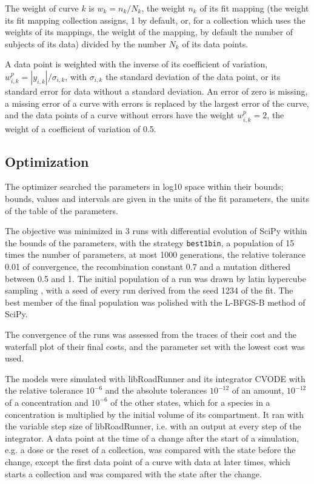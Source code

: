 The weight of curve $k$ is $w_k = n_k / N_k$, the weight $n_k$ of its fit mapping (the weight its fit mapping collection assigns, 1 by default, or, for a collection which uses the weights of its mappings, the weight of the mapping, by default the number of subjects of its data) divided by the number $N_k$ of its data points.

A data point is weighted with the inverse of its coefficient of variation, $w^{p}_{i,k} = |y_{i,k}| / \sigma_{i,k}$, with $\sigma_{i,k}$ the standard deviation of the data point, or its standard error for data without a standard deviation. An error of zero is missing, a missing error of a curve with errors is replaced by the largest error of the curve, and the data points of a curve without errors have the weight $w^{p}_{i,k} = 2$, the weight of a coefficient of variation of 0.5.

\subsection{Optimization}

The optimizer searched the parameters in log10 space within their bounds; bounds, values and intervals are given in the units of the fit parameters, the units of the table of the parameters.

The objective was minimized in 3 runs with differential evolution \cite{Storn1997} of SciPy \cite{Virtanen2020} within the bounds of the parameters, with the strategy \texttt{best1bin}, a population of 15 times the number of parameters, at most 1000 generations, the relative tolerance 0.01 of convergence, the recombination constant 0.7 and a mutation dithered between 0.5 and 1. The initial population of a run was drawn by latin hypercube sampling \cite{McKay1979}, with a seed of every run derived from the seed 1234 of the fit. The best member of the final population was polished with the L-BFGS-B method of SciPy.

The convergence of the runs was assessed from the traces of their cost and the waterfall plot of their final costs, and the parameter set with the lowest cost was used.

The models were simulated with libRoadRunner \cite{Welsh2023} and its integrator CVODE \cite{Hindmarsh2005} with the relative tolerance $10^{-6}$ and the absolute tolerances $10^{-12}$ of an amount, $10^{-12}$ of a concentration and $10^{-6}$ of the other states, which for a species in a concentration is multiplied by the initial volume of its compartment. It ran with the variable step size of libRoadRunner, i.e. with an output at every step of the integrator. A data point at the time of a change after the start of a simulation, e.g. a dose or the reset of a collection, was compared with the state before the change, except the first data point of a curve with data at later times, which starts a collection and was compared with the state after the change.

